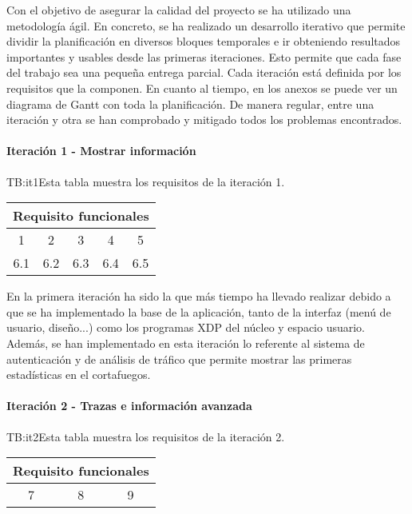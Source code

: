 Con el objetivo de asegurar la calidad del proyecto se ha utilizado una metodología ágil. En concreto, se ha realizado un desarrollo iterativo que permite dividir la planificación en diversos bloques temporales e ir obteniendo resultados importantes y usables desde las primeras iteraciones. Esto permite que cada fase del trabajo sea una pequeña entrega parcial. Cada iteración está definida por los requisitos que la componen. En cuanto al tiempo, en los anexos se puede ver un diagrama de Gantt con toda la planificación. De manera regular, entre una iteración y otra se han comprobado y mitigado todos los problemas encontrados.

\paragraph{Iteración 1 - Mostrar información}
\begin{table}[Tabla de la iteración 1]{TB:it1}{Esta tabla muestra los requisitos de la iteración 1.}
  \begin{tabular}{ccccc}
  \multicolumn{5}{c}{\textbf{Requisito funcionales}} \\ \hline
    \hline
    1 & 2 & 3 & 4 & 5\\
    6.1 & 6.2 & 6.3 & 6.4 & 6.5  \\
    \hline
  \end{tabular}
\end{table}

En la primera iteración ha sido la que más tiempo ha llevado realizar debido a que se ha implementado la base de la aplicación, tanto de la interfaz (menú de usuario, diseño...) como los programas XDP del núcleo y espacio usuario. Además, se han implementado en esta iteración lo referente al sistema de autenticación y de análisis de tráfico que permite mostrar las primeras estadísticas en el cortafuegos. 

\paragraph{Iteración 2 - Trazas e información avanzada}
\begin{table}[Tabla de la iteración 2]{TB:it2}{Esta tabla muestra los requisitos de la iteración 2.}
  \begin{tabular}{ccc}
  \multicolumn{3}{c}{\textbf{Requisito funcionales}} \\ \hline
    \hline
    7 & 8 & 9\\
    \hline
  \end{tabular}
\end{table}

